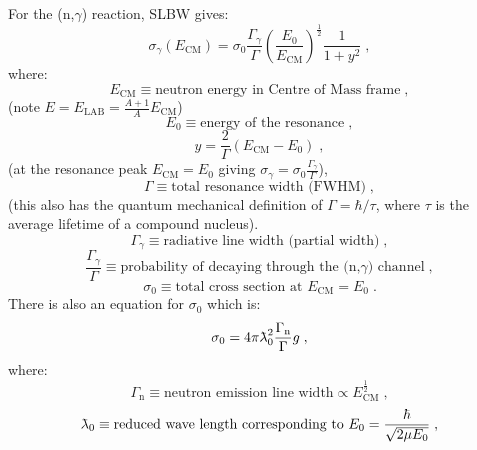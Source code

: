 For the (n,$\gamma$) reaction, SLBW gives:
\begin{equation*}
    \sigma_\gamma(E_\mathrm{CM}) = \sigma_0 \frac{\Gamma_\gamma}{\Gamma}\left(\frac{E_0}{E_\mathrm{CM}}\right)^{\frac{1}{2}}\frac{1}{1+y^2}\;\mathrm{,}
\end{equation*}
where:
\begin{equation*}
    E_\mathrm{CM} \equiv \text{neutron energy in Centre of Mass frame}\;\mathrm{,}
\end{equation*}
(note $E = E_\mathrm{LAB} = \frac{A+1}{A}E_\mathrm{CM}$)
\begin{equation*}
    E_0 \equiv \text{energy of the resonance}\;\mathrm{,}
\end{equation*}
\begin{equation*}
    y = \frac{2}{\Gamma}(E_\mathrm{CM} - E_0)\;\mathrm{,}
\end{equation*}
(at the resonance peak $E_\mathrm{CM} = E_0$ giving $\sigma_\gamma = \sigma_0 \frac{\Gamma_\gamma}{\Gamma}$),
\begin{equation*}
    \Gamma \equiv \text{total resonance width (FWHM)}\;\mathrm{,}
\end{equation*}
(this also has the quantum mechanical definition of $\Gamma = \hbar/\tau$, where $\tau$ is the average lifetime of a compound nucleus).
\begin{equation*}
    \Gamma_\gamma \equiv \text{radiative line width (partial width)}\;\mathrm{,}
\end{equation*}
\begin{equation*}
    \frac{\Gamma_\gamma}{\Gamma} \equiv \text{probability of decaying through the (n,}\gamma\text{) channel}\;\mathrm{,}
\end{equation*}
\begin{equation*}
    \sigma_0 \equiv \text{total cross section at }E_\mathrm{CM}=E_0\;\mathrm{.}
\end{equation*}
There is also an equation for $\sigma_0$ which is:
\begin{equation*}
    \sigma_0 = 4\pi\lambdabar^2_0\frac{\Gamma_\mathrm{n}}{\Gamma}g\;\mathrm{,}
\end{equation*}
where:
\begin{equation*}
    \Gamma_\mathrm{n} \equiv \text{neutron emission line width}\propto E^\frac{1}{2}_\mathrm{CM} \;\mathrm{,}
\end{equation*}
\begin{equation*}
    \lambdabar_0 \equiv \text{reduced wave length corresponding to }E_0 = \frac{\hbar}{\sqrt{2\mu E_0}}\;\mathrm{,}
\end{equation*}
